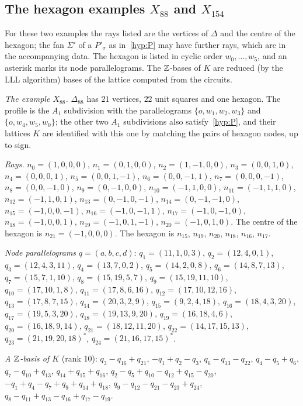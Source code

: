 \subsection{The hexagon examples \texorpdfstring{$X_{88}$}{X88} and \texorpdfstring{$X_{154}$}{X154}}\label{app:data-hex}
For these two examples the rays listed are the vertices of $\Delta$ and the centre of the hexagon; the fan $\Sigma'$ of a
$P'_\sigma$ as in~\ref{hyp:P} may have further rays, which are in the accompanying data. The hexagon is listed in cyclic order
$w_0,\dots,w_5$, and an asterisk marks its node parallelograms. The $\mathbb Z$-bases of $K$ are reduced (by the LLL algorithm)
bases of the lattice computed from the circuits.

\emph{The example $X_{88}$.} $\Delta_{88}$ has $21$ vertices, $22$ unit squares and one hexagon. The profile is the $A_1$ subdivision with the parallelograms $\{o,w_1,w_2,w_3\}$ and $\{o,w_4,w_5,w_0\}$; the other two $A_1$ subdivisions also satisfy~\ref{hyp:P}, and their lattices $K$ are identified with this one by matching the pairs of hexagon nodes, up to sign.

\emph{Rays.} $n_{0}=(1,0,0,0)$, $n_{1}=(0,1,0,0)$, $n_{2}=(1,-1,0,0)$, $n_{3}=(0,0,1,0)$, $n_{4}=(0,0,0,1)$, $n_{5}=(0,0,1,-1)$, $n_{6}=(0,0,-1,1)$, $n_{7}=(0,0,0,-1)$, $n_{8}=(0,0,-1,0)$, $n_{9}=(0,-1,0,0)$, $n_{10}=(-1,1,0,0)$, $n_{11}=(-1,1,1,0)$, $n_{12}=(-1,1,0,1)$, $n_{13}=(0,-1,0,-1)$, $n_{14}=(0,-1,-1,0)$, $n_{15}=(-1,0,0,-1)$, $n_{16}=(-1,0,-1,1)$, $n_{17}=(-1,0,-1,0)$, $n_{18}=(-1,0,0,1)$, $n_{19}=(-1,0,1,-1)$, $n_{20}=(-1,0,1,0)$. The centre of the hexagon is $n_{21}=(-1,0,0,0)$. The hexagon is $n_{15}$, $n_{19}$, $n_{20}$, $n_{18}$, $n_{16}$, $n_{17}$.

\emph{Node parallelograms} $q=(a,b,c,d)$: $q_{1}=(11,1,0,3)$, $q_{2}=(12,4,0,1)$, $q_{3}=(12,4,3,11)$, $q_{4}=(13,7,0,2)$, $q_{5}=(14,2,0,8)$, $q_{6}=(14,8,7,13)$, $q_{7}=(15,7,1,10)$, $q_{8}=(15,19,5,7)$, $q_{9}=(15,19,11,10)$, $q_{10}=(17,10,1,8)$, $q_{11}=(17,8,6,16)$, $q_{12}=(17,10,12,16)$, $q_{13}=(17,8,7,15)$, $q_{14}=(20,3,2,9)$, $q_{15}=(9,2,4,18)$, $q_{16}=(18,4,3,20)$, $q_{17}=(19,5,3,20)$, $q_{18}=(19,13,9,20)$, $q_{19}=(16,18,4,6)$, $q_{20}=(16,18,9,14)$, $q_{21}=(18,12,11,20)$, $q_{22}=(14,17,15,13)$, $q_{23}=(21,19,20,18)^{*}$, $q_{24}=(21,16,17,15)^{*}$.

\emph{A $\mathbb Z$-basis of $K$} (rank 10): $q_{3}-q_{16}+q_{21}$, $-q_{1}+q_{2}-q_{3}$, $q_{6}-q_{13}-q_{22}$, $q_{4}-q_{5}+q_{6}$, $q_{7}-q_{10}+q_{13}$, $q_{14}+q_{15}+q_{16}$, $q_{2}-q_{5}+q_{10}-q_{12}+q_{15}-q_{20}$, $-q_{1}+q_{4}-q_{7}+q_{9}+q_{14}+q_{18}$, $q_{9}-q_{12}-q_{21}-q_{23}+q_{24}$, $q_{8}-q_{11}+q_{13}-q_{16}+q_{17}-q_{19}$.

